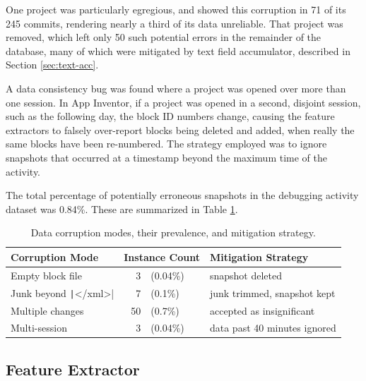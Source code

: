 One project was particularly egregious, and showed this corruption in 71 of its 245 commits, rendering nearly a third of its data unreliable. That project was removed, which left only 50 such potential errors in the remainder of the database, many of which were mitigated by text field accumulator, described in Section \ref{sec:text-acc}. 

A data consistency bug was found where a project was opened over more than one session. In App Inventor, if a project was opened in a second, disjoint session, such as the following day, the block ID numbers change, causing the feature extractors to falsely over-report blocks being deleted and added, when really the same blocks have been re-numbered. The strategy employed was to ignore snapshots that occurred at a timestamp beyond the maximum time of the activity.

The total percentage of potentially erroneous snapshots in the debugging activity dataset was 0.84\%. These are summarized in Table \ref{tab:data-corruption}.

	
\begin{table}
\begin{centering}
	\begin{tabular}{l r l p{5.4cm}}
	Corruption Mode 		& \multicolumn{2}{l}{Instance Count} 		& Mitigation Strategy 			\\ \hline
	Empty block file 						&  3 &(0.04\%) 				& snapshot deleted 						\\
	Junk beyond \texttt|</xml>| 	&  7 &(0.1\%) 				& junk trimmed, snapshot kept 			\\
	Multiple changes 						& 50 &(0.7\%) 				& accepted as insignificant 			\\
	Multi-session 							&  3 &(0.04\%) 				& data past 40 minutes ignored
	\end{tabular}
	\caption[Data corruption modes]{Data corruption modes, their prevalence, and mitigation strategy.}
	\label{tab:data-corruption}
\end{centering}
\end{table}


\subsection{Feature Extractor}
\label{sec:feature-extraction}

